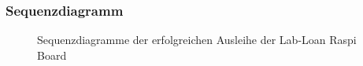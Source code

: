 \subsubsection{Sequenzdiagramm}
\label{sec:server:fsm:sequenz}
\begin{figure}
	\centering
	\caption{Sequenzdiagramme der erfolgreichen Ausleihe der Lab-Loan Raspi Board}
	\label{fig:seq}
\end{figure}

